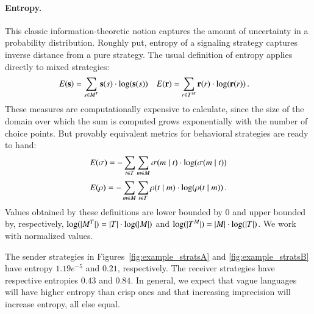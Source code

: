 \documentclass[fleqn,reqno,10pt]{article}
\renewcommand{\Smixed}{\ensuremath{\mathrm{\mathbf{s}}}}
\renewcommand{\Rmixed}{\ensuremath{\mathrm{\mathbf{r}}}}
\begin{document}
\paragraph{Entropy.} This classic information-theoretic notion
captures the amount of uncertainty in a probability
distribution. Roughly put, entropy of a signaling strategy captures
inverse distance from a pure strategy. The usual definition of entropy
applies directly to mixed strategies:
\begin{align*}
  E(\Smixed) & = \sum_{\Spure \in \Messgs^\States} \Smixed(\Spure) \cdot
  \log(\Smixed(\Spure)) & 
  E(\Rmixed) & = \sum_{\Rpure \in \States^\Messgs} \Rmixed(\Rpure) \cdot \log(\Rmixed(\Rpure)) \,.
\end{align*} 
These measures are computationally expensive to calculate, since the
size of the domain over which the sum is computed grows exponentially
with the number of choice points. But provably equivalent metrics for behavioral
strategies are ready to hand:
\begin{align*}
  E(\sigma) = -\sum_{t \in T} \sum_{m \in M}
  \sigma(m \mid t) \cdot \log(\sigma(m \mid
  t)) 
\end{align*} 
\begin{align*}
  E(\rho) = -\sum_{m \in M} \sum_{t \in T}
  \rho(t \mid m) \cdot \log(\rho(t \mid
  m)) \,. 
\end{align*}
Values obtained by these definitions are lower bounded by $0$ and
upper bounded by, respectively, $\log(|M^T|) = |T|
\cdot \log(|M|)$ and $\log(|T^M|) = |M| \cdot
\log(|T|)$. We work with normalized values. 

The sender strategies in Figures~\ref{fig:example_stratsA} and
\ref{fig:example_stratsB} have entropy $1.19e^{-5}$ and $0.21$,
respectively. The receiver strategies have respective entropies $0.43$
and $0.84$. In general, we expect that vague languages will have
higher entropy than crisp ones and that increasing imprecision will
increase entropy, all else equal.
\end{document}
